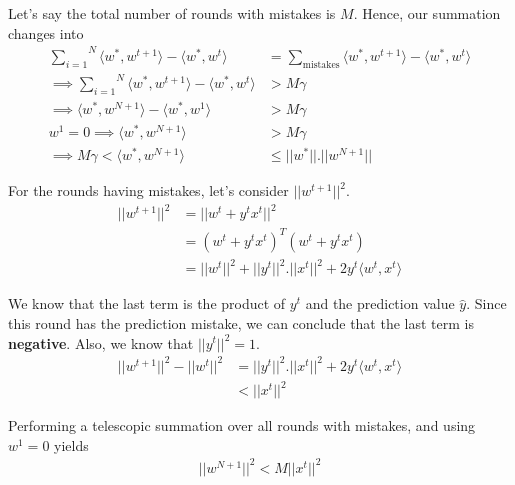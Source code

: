 \documentclass{report}
\begin{document}
\noindent Let's say the total number of rounds with mistakes is $M$. Hence, our summation changes into
\begin{align}
  \overset{N}{\underset{i=1}{\sum}} \langle w^*,w^{t+1} \rangle - \langle w^*,w^t \rangle          & = \underset{\text{mistakes}}{\sum} \langle w^*,w^{t+1} \rangle - \langle w^*,w^t \rangle \\
  \implies \overset{N}{\underset{i=1}{\sum}} \langle w^*,w^{t+1} \rangle - \langle w^*,w^t \rangle & > M\gamma                                                                                \\
  \implies \langle w^*,w^{N+1} \rangle - \langle w^*,w^1 \rangle                                   & > M\gamma                                                                                \\
  w^1 = 0 \implies \langle w^*,w^{N+1} \rangle                                                     & > M\gamma                                                                                \\
  \implies M\gamma < \langle w^*,w^{N+1} \rangle                                                   & \leq ||w^*||.||w^{N+1}||
\end{align}

\noindent For the rounds having mistakes, let's consider $||w^{t+1}||^2$.
\begin{align}
  ||w^{t+1}||^2 & = ||w^t + y^tx^t||^2                                            \\
                & = (w^t+y^tx^t)^T(w^t+y^tx^t)                                    \\
                & = ||w^t||^2 + ||y^t||^2.||x^t||^2 + 2y^t\langle w^t,x^t \rangle
\end{align}

\noindent We know that the last term is the product of $y^t$ and the prediction value $\hat{y}$. Since this round has the prediction mistake, we can conclude that the last term is \textbf{negative}. Also, we know that $||y^t||^2 = 1$.
\begin{align}
  ||w^{t+1}||^2 - ||w^t||^2 & = ||y^t||^2.||x^t||^2 + 2y^t\langle w^t,x^t \rangle \\
                            & < ||x^t||^2
\end{align}

\noindent Performing a telescopic summation over all rounds with mistakes, and using $w^1 = 0$ yields
\begin{align}
  ||w^{N+1}||^2 < M||x^t||^2
\end{align}
\end{document}
